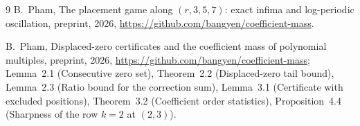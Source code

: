 \documentclass[11pt]{article}
\theoremstyle{definition}
\theoremstyle{plain}
\begin{document}
\begin{thebibliography}{9}
B.~Pham,
\newblock The placement game along $(r,3,5,7)$: exact infima and
log-periodic oscillation,
\newblock preprint, 2026, \url{https://github.com/bangyen/coefficient-mass}.

B.~Pham,
\newblock Displaced-zero certificates and the coefficient mass of polynomial
multiples,
\newblock preprint, 2026, \url{https://github.com/bangyen/coefficient-mass};
Lemma~2.1 (Consecutive zero set), Theorem~2.2 (Displaced-zero tail bound),
Lemma~2.3 (Ratio bound for the correction sum),
Lemma~3.1 (Certificate with excluded positions), Theorem~3.2 (Coefficient order statistics),
Proposition~4.4 (Sharpness of the row $k=2$ at $(2,3)$).
\end{thebibliography}
\end{document}
